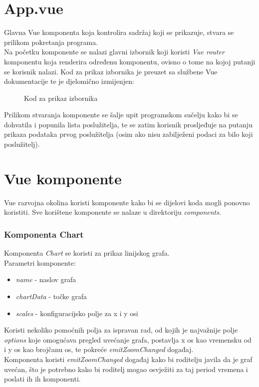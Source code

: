 \documentclass[zavrsnirad]{fer}
\begin{document}
\section{App.vue}
Glavna Vue komponenta koja kontrolira sadržaj koji se prikazuje, stvara se prilikom pokretanja programa.
\\Na početku komponente se nalazi glavni izbornik koji koristi \textit{Vue router} komponentu koja renderira određenu komponentu, ovisno o tome na kojoj putanji se korisnik nalazi. Kod za prikaz izbornika je preuzet sa službene Vue dokumentacije te je djelomično izmijenjen:
\begin{figure}[htb]
	\centering
	
	\caption{Kod za prikaz izbornika}
\end{figure}
\FloatBarrier
Prilikom stvaranja komponente se šalje upit programskom sučelju kako bi se dohvatila i popunila lista poslužitelja, te se zatim korisnik prosljeđuje na putanju prikaza podataka prvog poslužitelja (osim ako nisu zabilježeni podaci za bilo koji poslužitelj).

\section{Vue komponente}
Vue razvojna okolina koristi komponente kako bi se dijelovi koda mogli ponovno koristiti. Sve korištene komponente se nalaze u direktoriju \textit{components}.

\subsubsection{Komponenta Chart}
Komponenta \textit{Chart} se koristi za prikaz linijskog grafa.
\\Parametri komponente:
\begin{itemize}
	\item \textit{name} - naslov grafa
	\item \textit{chartData} - točke grafa
	\item \textit{scales} - konfiguracijsko polje za x i y osi
\end{itemize}
Koristi nekoliko pomoćnih polja za ispravan rad, od kojih je najvažnije polje \textit{options} koje omogućava pregled uvećanje grafa, postavlja x os kao vremensku od i y os kao brojčanu os, te pokreće \textit{emitZoomChanged} događaj.
\\Komponenta koristi \textit{emitZoomChanged} događaj kako bi roditelju javila da je graf uvećan, što je potrebno kako bi roditelj mogao osvježiti za taj period vremena i poslati ih ih komponenti.
\end{document}
